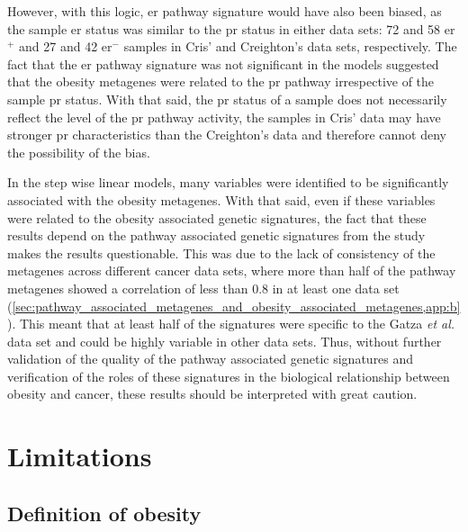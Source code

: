 However, with this logic, \gls{er} pathway signature would have also been biased, as the  sample  \gls{er} status was similar to the \gls{pr} status in either data sets: 72 and 58 \gls{er}$^+$ and 27 and 42 \gls{er}$^-$ samples in Cris' and Creighton's data sets, respectively.
The fact that the \gls{er} pathway signature was not significant in the models suggested that the obesity metagenes were related to the \gls{pr} pathway irrespective of the sample \gls{pr} status.
With that said, the \gls{pr} status of a sample does not necessarily reflect the level of the \gls{pr} pathway activity, the samples in Cris' data may have stronger \gls{pr} characteristics than the Creighton's data and therefore cannot deny the possibility of the bias.

In the step wise linear models, many variables were identified to be significantly associated with the obesity metagenes.
With that said, even if these variables were related to the obesity associated genetic signatures, the fact that these results depend on the pathway associated genetic signatures from the \citet{Gatza2010a} study makes the results questionable.
This was due to the lack of consistency of the metagenes across different cancer data sets, where more than half of the pathway metagenes showed a correlation of less than 0.8 in at least one data set (\cref{sec:pathway_associated_metagenes_and_obesity_associated_metagenes,app:b}).
This meant that at least half of the signatures were specific to the Gatza \textit{et al.} data set and could be highly variable in other data sets.
Thus, without further validation of the quality of the pathway associated genetic signatures and verification of the roles of these signatures in the biological relationship between obesity and cancer, these results should be interpreted with great caution.

\section{Limitations}
\label{sec:limitations}


\subsection{Definition of obesity}
\label{sub:discussion_definition_of_obesity}

